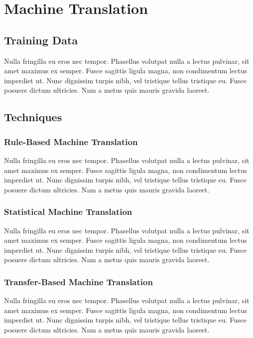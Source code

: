 \section{Machine Translation}
\label{Machine Translation}


\subsection{Training Data}
Nulla fringilla eu eros nec tempor. Phasellus volutpat nulla a lectus pulvinar, sit amet maximus ex semper. Fusce sagittis ligula magna, non condimentum lectus imperdiet ut. Nunc dignissim turpis nibh, vel tristique tellus tristique eu. Fusce posuere dictum ultricies. Nam a metus quis mauris gravida laoreet.

\subsection{Techniques}

\subsubsection{Rule-Based Machine Translation}
Nulla fringilla eu eros nec tempor. Phasellus volutpat nulla a lectus pulvinar, sit amet maximus ex semper. Fusce sagittis ligula magna, non condimentum lectus imperdiet ut. Nunc dignissim turpis nibh, vel tristique tellus tristique eu. Fusce posuere dictum ultricies. Nam a metus quis mauris gravida laoreet.

\subsubsection{Statistical Machine Translation}
Nulla fringilla eu eros nec tempor. Phasellus volutpat nulla a lectus pulvinar, sit amet maximus ex semper. Fusce sagittis ligula magna, non condimentum lectus imperdiet ut. Nunc dignissim turpis nibh, vel tristique tellus tristique eu. Fusce posuere dictum ultricies. Nam a metus quis mauris gravida laoreet.

\subsubsection{Transfer-Based Machine Translation}
Nulla fringilla eu eros nec tempor. Phasellus volutpat nulla a lectus pulvinar, sit amet maximus ex semper. Fusce sagittis ligula magna, non condimentum lectus imperdiet ut. Nunc dignissim turpis nibh, vel tristique tellus tristique eu. Fusce posuere dictum ultricies. Nam a metus quis mauris gravida laoreet.


